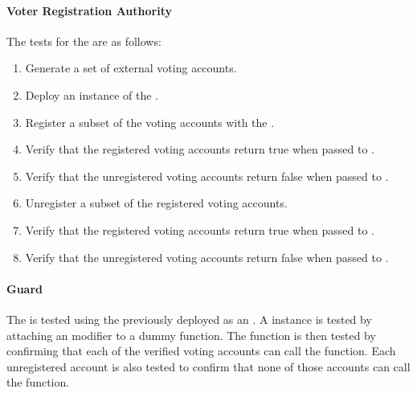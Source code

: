 \paragraph{Voter Registration Authority}
The tests for the  are as follows:
\begin{enumerate}
  \item Generate a set of external voting accounts.
  \item Deploy an instance of the .
  \item Register a subset of the voting accounts with the
    .
  \item Verify that the registered voting accounts return true when passed to
    .
  \item Verify that the unregistered voting accounts return false when passed to
    .
  \item Unregister a subset of the registered voting accounts.
  \item Verify that the registered voting accounts return true when passed to
    .
  \item Verify that the unregistered voting accounts return false when passed to
    .
\end{enumerate}

\paragraph{Guard}
The  is tested using the previously deployed
 as an . A 
instance is tested by attaching an  modifier to a dummy 
function. The  function is then tested by confirming that each of the
verified voting accounts can call the  function. Each unregistered
account is also tested to confirm that none of those accounts can call the
 function.


